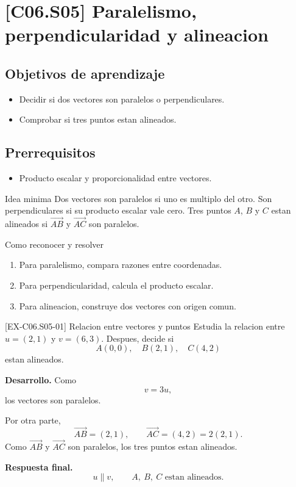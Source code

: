 \section{[C06.S05] Paralelismo, perpendicularidad y alineacion}

\subsection*{Objetivos de aprendizaje}
\begin{itemize}
  \item Decidir si dos vectores son paralelos o perpendiculares.
  \item Comprobar si tres puntos estan alineados.
\end{itemize}

\subsection*{Prerrequisitos}
\begin{itemize}
  \item Producto escalar y proporcionalidad entre vectores.
\end{itemize}

\begin{theorybox}{Idea minima}
Dos vectores son paralelos si uno es multiplo del otro. Son perpendiculares si su producto
escalar vale cero. Tres puntos \(A\), \(B\) y \(C\) estan alineados si \(\overrightarrow{AB}\) y
\(\overrightarrow{AC}\) son paralelos.
\end{theorybox}

\begin{methodbox}{Como reconocer y resolver}
\begin{enumerate}
  \item Para paralelismo, compara razones entre coordenadas.
  \item Para perpendicularidad, calcula el producto escalar.
  \item Para alineacion, construye dos vectores con origen comun.
\end{enumerate}
\end{methodbox}

\begin{solvedexample}{[EX-C06.S05-01] Relacion entre vectores y puntos}
Estudia la relacion entre \(u=(2,1)\) y \(v=(6,3)\). Despues, decide si
\[
A(0,0),\quad B(2,1),\quad C(4,2)
\]
estan alineados.

\textbf{Desarrollo.} Como
\[
v=3u,
\]
los vectores son paralelos.

Por otra parte,
\[
\overrightarrow{AB}=(2,1),
\qquad
\overrightarrow{AC}=(4,2)=2(2,1).
\]
Como \(\overrightarrow{AB}\) y \(\overrightarrow{AC}\) son paralelos, los tres puntos estan
alineados.

\textbf{Respuesta final.}
\[
u \parallel v,
\qquad
A,\ B,\ C \text{ estan alineados}.
\]
\end{solvedexample}

